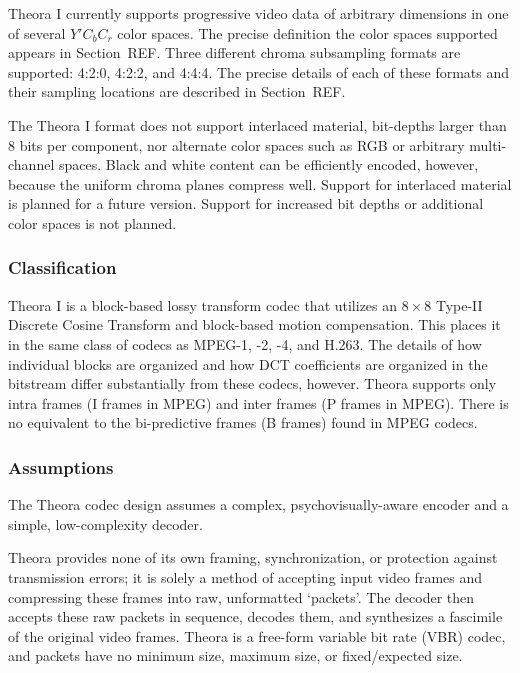 \documentclass[11pt,letterpaper]{article}
\begin{document}
Theora I currently supports progressive video data of arbitrary dimensions in
 one of several $Y'C_bC_r$ color spaces.
The precise definition the color spaces supported appears in Section~REF.
Three different chroma subsampling formats are supported: 4:2:0, 4:2:2,
 and 4:4:4.
The precise details of each of these formats and their sampling locations are
 described in Section~REF.

The Theora I format does not support interlaced material, bit-depths larger
 than 8 bits per component, nor alternate color spaces such as RGB or
 arbitrary multi-channel spaces.
Black and white content can be efficiently encoded, however, because the
 uniform chroma planes compress well.
Support for interlaced material is planned for a future version.
Support for increased bit depths or additional color spaces is not planned.

\subsubsection{Classification}

Theora I is a block-based lossy transform codec that utilizes an
 $8\times 8$ Type-II Discrete Cosine Transform and block-based motion
 compensation.
This places it in the same class of codecs as MPEG-1, -2, -4, and H.263.
The details of how individual blocks are organized and how DCT coefficients are
 organized in the bitstream differ substantially from these codecs, however.
Theora supports only intra frames (I frames in MPEG) and inter frames (P frames
 in MPEG).
There is no equivalent to the bi-predictive frames (B frames) found in MPEG
 codecs.

\subsubsection{Assumptions}

The Theora codec design assumes a complex, psychovisually-aware encoder and a
 simple, low-complexity decoder.

Theora provides none of its own framing, synchronization, or protection against
 transmission errors; it is solely a method of accepting input video frames and
 compressing these frames into raw, unformatted `packets'.
The decoder then accepts these raw packets in sequence, decodes them, and
 synthesizes a fascimile of the original video frames.
Theora is a free-form variable bit rate (VBR) codec, and packets have no
 minimum size, maximum size, or fixed/expected size.
\end{document}
